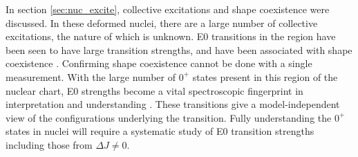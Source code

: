In section \ref{sec:nuc_excite}, collective excitations and shape coexistence were discussed. In these deformed nuclei, there are a large number of collective excitations, the nature of which is unknown. E0 transitions in the region have been seen to have large transition strengths, and have been associated with shape coexistence \citep{wood99:_e0}. Confirming shape coexistence cannot be done with a single measurement. With the large number of $0^+$ states present in this region of the nuclear chart, E0 strengths become a vital spectroscopic fingerprint in interpretation and understanding \citep{heyde11:_shape_coexist}. These transitions give a model-independent view of the configurations underlying the transition. Fully understanding the $0^+$ states in nuclei will require a systematic study of E0 transition strengths including those from $\Delta J\neq0$.